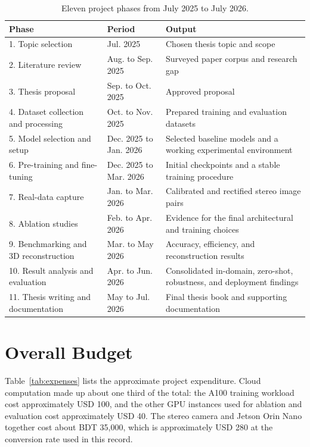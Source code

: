 \begin{table}[!htbp]
\centering
\caption{Eleven project phases from July 2025 to July 2026.}
\label{tab:timeframe}
\small
\begin{tabular}{p{4.2cm}p{3.0cm}p{6.3cm}}
\toprule
Phase & Period & Output\\
\midrule
1. Topic selection & Jul. 2025 & Chosen thesis topic and scope\\
2. Literature review & Aug. to Sep. 2025 & Surveyed paper corpus and research gap\\
3. Thesis proposal & Sep. to Oct. 2025 & Approved proposal\\
4. Dataset collection and processing & Oct. to Nov. 2025 & Prepared training and evaluation datasets\\
5. Model selection and setup & Dec. 2025 to Jan. 2026 & Selected baseline models and a working experimental environment\\
6. Pre-training and fine-tuning & Dec. 2025 to Mar. 2026 & Initial checkpoints and a stable training procedure\\
7. Real-data capture & Jan. to Mar. 2026 & Calibrated and rectified stereo image pairs\\
8. Ablation studies & Feb. to Apr. 2026 & Evidence for the final architectural and training choices\\
9. Benchmarking and 3D reconstruction & Mar. to May 2026 & Accuracy, efficiency, and reconstruction results\\
10. Result analysis and evaluation & Apr. to Jun. 2026 & Consolidated in-domain, zero-shot, robustness, and deployment findings\\
11. Thesis writing and documentation & May to Jul. 2026 & Final thesis book and supporting documentation\\
\bottomrule
\end{tabular}
\end{table}

\FloatBarrier
\section{Overall Budget}
\label{sec:8-3}
Table~\ref{tab:expenses} lists the approximate project expenditure.
Cloud computation made up about one third of the total: the A100
training workload cost approximately USD 100, and the other GPU
instances used for ablation and evaluation cost approximately USD 40.
The stereo camera and Jetson Orin Nano together cost about BDT 35,000,
which is approximately USD 280 at the conversion rate used in this
record.

